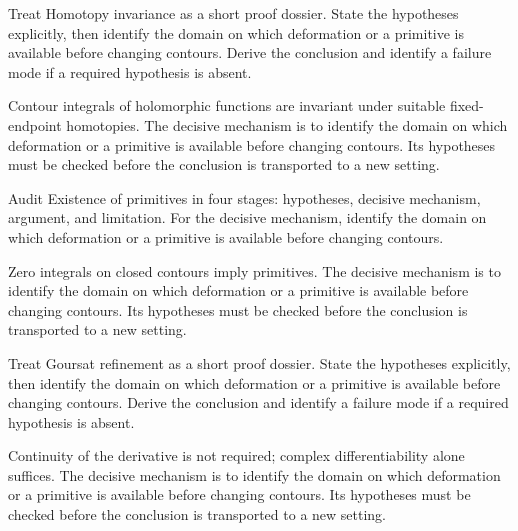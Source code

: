 \begin{problem}\label{prob:iv05-problem-04}
Treat Homotopy invariance as a short proof dossier. State the hypotheses explicitly, then identify the domain on which deformation or a primitive is available before changing contours. Derive the conclusion and identify a failure mode if a required hypothesis is absent.
\end{problem}
\begin{solution}
Contour integrals of holomorphic functions are invariant under suitable fixed-endpoint homotopies. The decisive mechanism is to identify the domain on which deformation or a primitive is available before changing contours. Its hypotheses must be checked before the conclusion is transported to a new setting.
\end{solution}

\begin{problem}\label{prob:iv05-problem-05}
Audit Existence of primitives in four stages: hypotheses, decisive mechanism, argument, and limitation. For the decisive mechanism, identify the domain on which deformation or a primitive is available before changing contours.
\end{problem}
\begin{solution}
Zero integrals on closed contours imply primitives. The decisive mechanism is to identify the domain on which deformation or a primitive is available before changing contours. Its hypotheses must be checked before the conclusion is transported to a new setting.
\end{solution}

\begin{problem}\label{prob:iv05-problem-06}
Treat Goursat refinement as a short proof dossier. State the hypotheses explicitly, then identify the domain on which deformation or a primitive is available before changing contours. Derive the conclusion and identify a failure mode if a required hypothesis is absent.
\end{problem}
\begin{solution}
Continuity of the derivative is not required; complex differentiability alone suffices. The decisive mechanism is to identify the domain on which deformation or a primitive is available before changing contours. Its hypotheses must be checked before the conclusion is transported to a new setting.
\end{solution}

